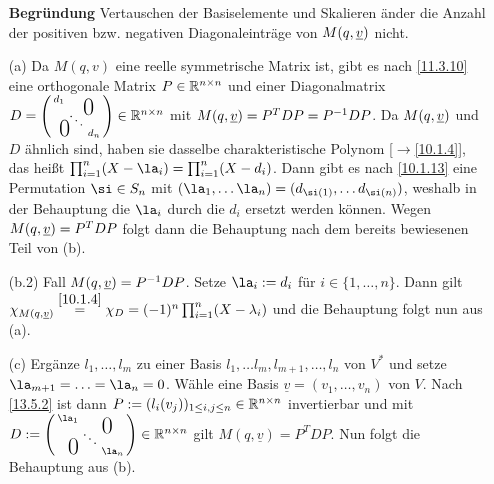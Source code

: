 \documentclass[../../main.tex]{subfiles}
\begin{document}
\begin{cproof}
\begin{itemize}
\begin{behbox}
            \textbf{Begründung} 
                Vertauschen der Basiselemente und Skalieren änder die Anzahl der positiven bzw. negativen Diagonaleinträge von $M(q,{\underline v})$ nicht.
        \end{behbox}
        \item[(a)] 
            Da $M(q,v)$ eine reelle symmetrische Matrix ist, gibt es nach \ref{11.3.10} eine orthogonale Matrix $P\in \mathbb R^{n\times n} $ und einer Diagonalmatrix $D=\left(
                \begin{smallmatrix}
                    d_1 & & \llap{$\overset{\blap{\LARGE 0}}{~}$} \\
                    & \ddots &\\
                    \rlap{\tlap{\LARGE 0}} & & d_n
                \end{smallmatrix}
            \right)\in \R^{n\times n}$ mit $M(q,{\underline v})=P^TDP=P^{-1}DP$. Da $M(q,{\underline v})$ und $D$ ähnlich sind, haben sie dasselbe charakteristische Polynom [$\to$\ref{10.1.4}], das heißt $\prod_{i=1}^n(X-\la_i)=\prod_{i=1}^n(X-d_i)$. Dann gibt es nach \ref{10.1.13} eine Permutation $\si\in S_n$ mit $(\la_1,\ldots \la_n)=(d_{\si(1)},\ldots d_{\si(n)})$, weshalb in der Behauptung die $\la_i$ durch die $d_i$ ersetzt werden können. Wegen $M(q,{\underline v})=P^TDP$ folgt dann die Behauptung nach dem bereits bewiesenen Teil von (b).
        \item[(b.2)] Fall $M(q,{\underline v})=P^{-1}DP$. 
            Setze $\la_i:= d_i$ für $i\in\{1,\ldots ,n\}$. Dann gilt $\chi_{M(q,{\underline v})}\stackrel{\ref{10.1.4}}{=}\chi_D=(-1)^n\prod_{i=1}^n(X-\lambda_i)$ und die Behauptung folgt nun aus (a).
        \item[(c)] 
            Ergänze $l_1,\ldots ,l_m$ zu einer Basis $l_1,\ldots l_m,l_{m+1},\ldots ,l_n$ von $V^*$ und setze $\la_{m+1}=\ldots =\la_n=0$. Wähle eine Basis $\underline{v}=(v_1,\ldots ,v_n)$ von $V$. Nach \ref{13.5.2} ist dann $P:=(l_i(v_j))_{1\le i,j\le n}\in \mathbb R^{n\times n}$ invertierbar und mit $D:=\left(
                \begin{smallmatrix}
                    \la_1 & & \llap{$\overset{\blap{\LARGE 0}}{~}$} \\
                    & \ddots &\\
                    \rlap{\tlap{\LARGE 0}} & & \la_n
                \end{smallmatrix}
            \right)\in \R^{n\times n}$ gilt $M(q,\underline{v})=P^TDP$. Nun folgt die Behauptung aus (b).
    \end{itemize} 
\end{cproof}
\end{document}
